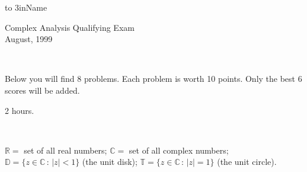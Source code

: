 \documentclass[12pt]{article}
\begin{document}
\vspace*{-1in}
\hfill\hbox to 3in{Name\hrulefill}
\vspace{1in}
\begin{center}{\large Complex Analysis Qualifying Exam}
\\\bigskip
{\large August, 1999}
\end{center}

\

  Below you will find 8 problems.
Each problem is worth 10 points. Only the
best 6 scores will be added.

 2 hours.

\

 $\mathbb{R}=$ set of all real numbers;
$\mathbb{C}=$ set of all complex numbers; $\mathbb{D}=\{z\in\mathbb{C}\,:\,|z|<1\}$ (the unit disk); $\mathbb{T}=\{z\in\mathbb{C}\,:\,|z|=1\}$ (the unit circle).

\
\end{document}
